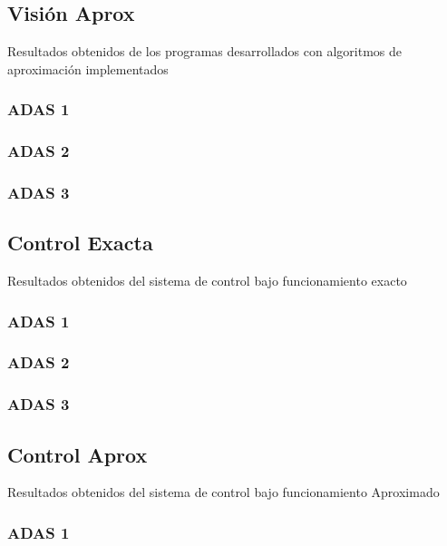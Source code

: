 \subsection{Visión Aprox}

Resultados obtenidos de los programas desarrollados con algoritmos de aproximación implementados


\subsubsection{ADAS 1}

\subsubsection{ADAS 2}

\subsubsection{ADAS 3}

\subsection{Control Exacta}

Resultados obtenidos del sistema de control bajo funcionamiento exacto

\subsubsection{ADAS 1}

\subsubsection{ADAS 2}

\subsubsection{ADAS 3}


\subsection{Control Aprox}

Resultados obtenidos del sistema de control bajo funcionamiento Aproximado

\subsubsection{ADAS 1}

